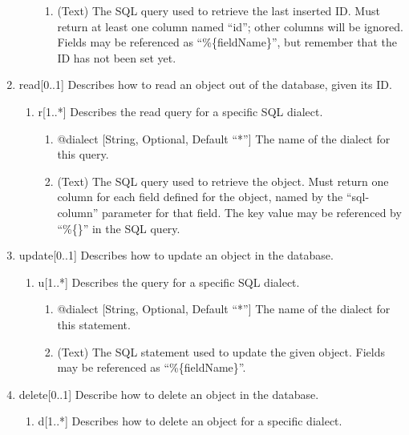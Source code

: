 \documentclass{book}
\begin{document}
\begin{enumerate}
\begin{enumerate}
\begin{enumerate}
            \item (Text) The SQL query used to retrieve the last inserted ID.
                  Must return at least one column named ``id''; other columns
                  will be ignored. Fields may be referenced as
                  ``\%\{fieldName\}'', but remember that the ID has not been set
                  yet.
        \end{enumerate}
    \end{enumerate}
    \item read[0..1] Describes how to read an object out of the database, given
          its ID.
    \begin{enumerate}
        \item r[1..*] Describes the read query for a specific SQL dialect.
            \begin{enumerate}
            \item @dialect [String, Optional, Default ``*''] The name of the
                  dialect for this query.
            \item (Text) The SQL query used to retrieve the object. Must return
                  one column for each field defined for the object, named by the
                  ``sql-column'' parameter for that field. The key value may be
                  referenced by ``\%\{\}'' in the SQL query.
        \end{enumerate}
    \end{enumerate}
    \item update[0..1] Describes how to update an object in the database.
    \begin{enumerate}
        \item u[1..*] Describes the query for a specific SQL dialect.
        \begin{enumerate}
            \item @dialect [String, Optional, Default ``*''] The name of the
                  dialect for this statement.
            \item (Text) The SQL statement used to update the given object.
                  Fields may be referenced as ``\%\{fieldName\}''.
        \end{enumerate}
    \end{enumerate}
    \item delete[0..1] Describe how to delete an object in the database.
    \begin{enumerate}
        \item d[1..*] Describes how to delete an object for a specific dialect.

\end{enumerate}
\end{enumerate}
\end{document}
